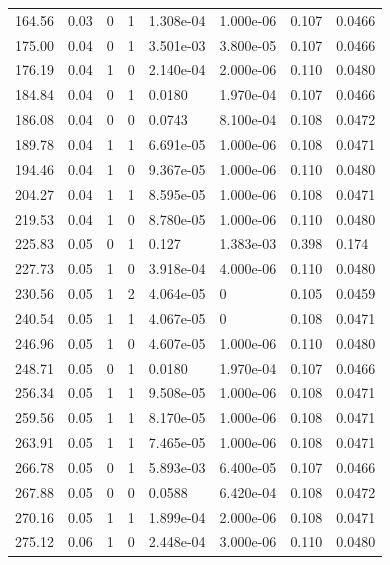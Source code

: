 \documentclass[preview]{standalone}
\begin{document}
{{\begin{tabular}{L{1.2cm}C{1.2cm} C{0.3cm}C{0.5cm} C{1.4cm}C{1.4cm} C{1.4cm}C{1.4cm}}
  164.56  &  0.03  & 0     &  1 &  1.308e-04  & 1.000e-06  & 0.107 &  0.0466   \\ 
  175.00  &  0.04  & 0     &  1 &  3.501e-03  & 3.800e-05  & 0.107 &  0.0466   \\ 
  176.19  &  0.04  & 1     &  0 &  2.140e-04  & 2.000e-06  & 0.110 &  0.0480   \\ 
  184.84  &  0.04  & 0     &  1 &  0.0180  & 1.970e-04  & 0.107 &  0.0466   \\ 
  186.08  &  0.04  & 0     &  0 &  0.0743  & 8.100e-04  & 0.108 &  0.0472   \\ 
  189.78  &  0.04  & 1     &  1 &  6.691e-05  & 1.000e-06  & 0.108 &  0.0471   \\ 
  194.46  &  0.04  & 1     &  0 &  9.367e-05  & 1.000e-06  & 0.110 &  0.0480   \\ 
  204.27  &  0.04  & 1     &  1 &  8.595e-05  & 1.000e-06  & 0.108 &  0.0471   \\ 
  219.53  &  0.04  & 1     &  0 &  8.780e-05  & 1.000e-06  & 0.110 &  0.0480   \\ 
  225.83  &  0.05  & 0     &  1 &  0.127  & 1.383e-03  & 0.398 &  0.174   \\ 
  227.73  &  0.05  & 1     &  0 &  3.918e-04  & 4.000e-06  & 0.110 &  0.0480   \\ 
  230.56  &  0.05  & 1     &  2 &  4.064e-05  & 0  & 0.105 &  0.0459   \\ 
  240.54  &  0.05  & 1     &  1 &  4.067e-05  & 0  & 0.108 &  0.0471   \\ 
  246.96  &  0.05  & 1     &  0 &  4.607e-05  & 1.000e-06  & 0.110 &  0.0480   \\ 
  248.71  &  0.05  & 0     &  1 &  0.0180  & 1.970e-04  & 0.107 &  0.0466   \\ 
  256.34  &  0.05  & 1     &  1 &  9.508e-05  & 1.000e-06  & 0.108 &  0.0471   \\ 
  259.56  &  0.05  & 1     &  1 &  8.170e-05  & 1.000e-06  & 0.108 &  0.0471   \\ 
  263.91  &  0.05  & 1     &  1 &  7.465e-05  & 1.000e-06  & 0.108 &  0.0471   \\ 
  266.78  &  0.05  & 0     &  1 &  5.893e-03  & 6.400e-05  & 0.107 &  0.0466   \\ 
  267.88  &  0.05  & 0     &  0 &  0.0588  & 6.420e-04  & 0.108 &  0.0472   \\ 
  270.16  &  0.05  & 1     &  1 &  1.899e-04  & 2.000e-06  & 0.108 &  0.0471   \\ 
  275.12  &  0.06  & 1     &  0 &  2.448e-04  & 3.000e-06  & 0.110 &  0.0480   \\ 

\end{tabular}}}
\end{document}
